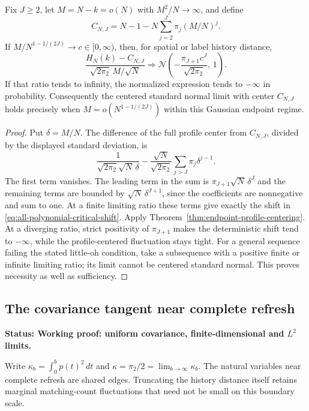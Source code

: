 \documentclass[11pt,letterpaper]{article}
\newcommand{\status}[1]{\textbf{Status: #1.}}
\begin{document}
\begin{corollary}
\label{cor:all-polynomial-windows-sharp}
Fix $J\ge2$, let $M=N-k=o(N)$ with $M^2/N\to\infty$,
and define
\[
 C_{N,J}=N-1-N\sum_{j=2}^J\pi_j(M/N)^j.
\]
If $M/N^{1-1/(2J)}\to c\in[0,\infty)$, then, for
spatial or label history distance,
\begin{equation}\label{eq:all-polynomial-critical-shift}
 \frac{H_N(k)-C_{N,J}}{\sqrt{2\pi_2}\,M/\sqrt N}
       \Longrightarrow
       \mathcal N\left(-\frac{\pi_{J+1}c^J}{\sqrt{2\pi_2}},\,1\right).
\end{equation}
If that ratio tends to infinity, the normalized expression
tends to $-\infty$ in probability.
Consequently the centered standard normal limit with center
$C_{N,J}$ holds precisely when
$M=o(N^{1-1/(2J)})$ within this Gaussian endpoint regime.
\end{corollary}
\begin{proof}
Put $\delta=M/N$.
The difference of the full profile center from $C_{N,J}$,
divided by the displayed standard deviation, is
\[
 \frac1{\sqrt{2\pi_2}\sqrt N\,\delta}
 -\frac{\sqrt N}{\sqrt{2\pi_2}}
                    \sum_{j>J}\pi_j\delta^{j-1}.
\]
The first term vanishes. The leading term in the sum is
$\pi_{J+1}\sqrt N\,\delta^J$ and the remaining terms are
bounded by $\sqrt N\,\delta^{J+1}$, since the coefficients
are nonnegative and sum to one.
At a finite limiting ratio these terms give exactly the
shift in \eqref{eq:all-polynomial-critical-shift}.
Apply Theorem~\ref{thm:endpoint-profile-centering}.
At a diverging ratio, strict positivity of $\pi_{J+1}$
makes the deterministic shift tend to $-\infty$, while
the profile-centered fluctuation stays tight.
For a general sequence failing the stated little-oh
condition, take a subsequence with a positive finite or
infinite limiting ratio; its limit cannot be centered
standard normal. This proves necessity as well as sufficiency.
\end{proof}

\subsection{The covariance tangent near complete refresh}
\label{sec:upper-Gaussian-tangent}

\status{Working proof: uniform covariance, finite-dimensional and $L^2$ limits}

Write $\kappa_b=\int_0^b p(t)^2\,dt$ and
$\kappa=\pi_2/2=\lim_{b\to\infty}\kappa_b$.
The natural variables near complete refresh are shared edges.
Truncating the history distance itself retains marginal matching-count
fluctuations that need not be small on this boundary scale.
\end{document}
